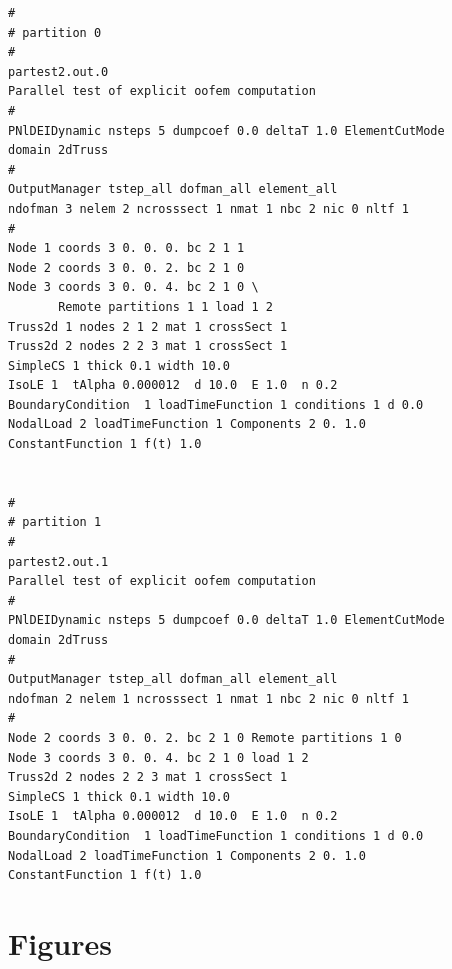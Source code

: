 \documentclass[a4paper]{article}
\begin{document}
\begin{verbatim}
#
# partition 0
#
partest2.out.0
Parallel test of explicit oofem computation
#
PNlDEIDynamic nsteps 5 dumpcoef 0.0 deltaT 1.0 ElementCutMode
domain 2dTruss
#
OutputManager tstep_all dofman_all element_all
ndofman 3 nelem 2 ncrosssect 1 nmat 1 nbc 2 nic 0 nltf 1
#
Node 1 coords 3 0. 0. 0. bc 2 1 1  
Node 2 coords 3 0. 0. 2. bc 2 1 0  
Node 3 coords 3 0. 0. 4. bc 2 1 0 \
       Remote partitions 1 1 load 1 2
Truss2d 1 nodes 2 1 2 mat 1 crossSect 1
Truss2d 2 nodes 2 2 3 mat 1 crossSect 1
SimpleCS 1 thick 0.1 width 10.0
IsoLE 1  tAlpha 0.000012  d 10.0  E 1.0  n 0.2  
BoundaryCondition  1 loadTimeFunction 1 conditions 1 d 0.0
NodalLoad 2 loadTimeFunction 1 Components 2 0. 1.0
ConstantFunction 1 f(t) 1.0


#
# partition 1
#
partest2.out.1
Parallel test of explicit oofem computation
#
PNlDEIDynamic nsteps 5 dumpcoef 0.0 deltaT 1.0 ElementCutMode
domain 2dTruss
#
OutputManager tstep_all dofman_all element_all
ndofman 2 nelem 1 ncrosssect 1 nmat 1 nbc 2 nic 0 nltf 1
#
Node 2 coords 3 0. 0. 2. bc 2 1 0 Remote partitions 1 0
Node 3 coords 3 0. 0. 4. bc 2 1 0 load 1 2 
Truss2d 2 nodes 2 2 3 mat 1 crossSect 1
SimpleCS 1 thick 0.1 width 10.0
IsoLE 1  tAlpha 0.000012  d 10.0  E 1.0  n 0.2  
BoundaryCondition  1 loadTimeFunction 1 conditions 1 d 0.0
NodalLoad 2 loadTimeFunction 1 Components 2 0. 1.0
ConstantFunction 1 f(t) 1.0
\end{verbatim}

\section{Figures}
\end{document}
